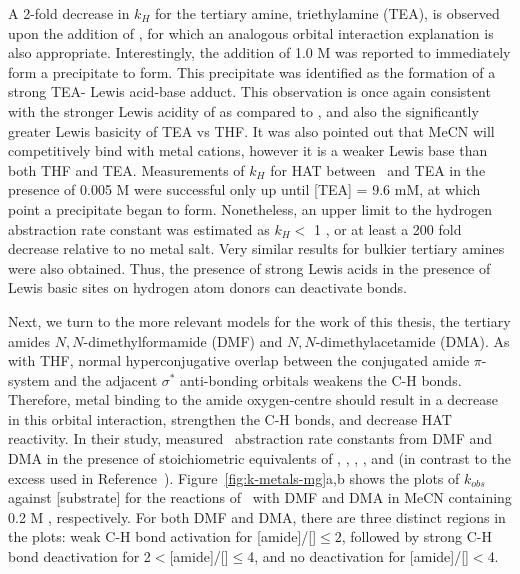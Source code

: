 A 2-fold decrease in $k_H$ for the tertiary amine, triethylamine (TEA), is observed upon the addition of , for which an analogous orbital interaction explanation is also appropriate. Interestingly, the addition of 1.0 M  was reported to immediately form a precipitate to form. This precipitate was identified as the formation of a strong TEA- Lewis acid-base adduct. This observation is once again consistent with the stronger Lewis acidity of  as compared to , and also the significantly greater Lewis basicity of TEA vs THF.\cite{Salamone2013a, Reichardt2010} It was also pointed out that MeCN will competitively bind with metal cations, however it is a weaker Lewis base than both THF and TEA. Measurements of $k_H$ for HAT between \cumo\ and TEA in the presence of 0.005 M  were successful only up until [TEA] = 9.6 mM, at which point a precipitate began to form. Nonetheless, an upper limit to the hydrogen abstraction rate constant was estimated as $k_H <$ 1 \Ms, or at least a 200 fold decrease relative to no metal salt. Very similar results for bulkier tertiary amines were also obtained. Thus, the presence of strong Lewis acids in the presence of Lewis basic sites on hydrogen atom donors can deactivate  bonds.

Next, we turn to the more relevant models for the work of this thesis, the tertiary amides $N,N$-dimethylformamide (DMF) and $N,N$-dimethylacetamide (DMA). As with THF, normal hyperconjugative overlap between the conjugated amide $\pi$-system and the adjacent  $\sigma^*$ anti-bonding orbitals weakens the C-H bonds. Therefore, metal binding to the amide oxygen-centre should result in a decrease in this orbital interaction, strengthen the C-H bonds, and decrease HAT reactivity. In their study, \citet{Salamone2015metals} measured \cumo\ abstraction rate constants from DMF and DMA in the presence of stoichiometric equivalents of , , , , and  (in contrast to the excess used in Reference~). Figure~\ref{fig:k-metals-mg}a,b shows the plots of $k_{obs}$ against [substrate] for the reactions of \cumo\ with DMF and DMA in MeCN containing 0.2 M , respectively. For both DMF and DMA, there are three distinct regions in the plots: weak C-H bond activation for [amide]/[]$\leq 2$, followed by strong C-H bond deactivation for 2$<$[amide]/[]$\leq$4, and no deactivation for [amide]/[]$<$4.

